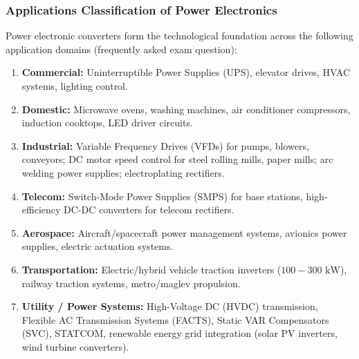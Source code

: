 \documentclass[11pt,a4paper]{article}
\begin{document}
\subsubsection{Applications Classification of Power Electronics}
Power electronic converters form the technological foundation across the following application domains (frequently asked exam question):
\begin{enumerate}[leftmargin=*]
  \item \textbf{Commercial:} Uninterruptible Power Supplies (UPS), elevator drives, HVAC systems, lighting control.
  \item \textbf{Domestic:} Microwave ovens, washing machines, air conditioner compressors, induction cooktops, LED driver circuits.
  \item \textbf{Industrial:} Variable Frequency Drives (VFDs) for pumps, blowers, conveyors; DC motor speed control for steel rolling mills, paper mills; arc welding power supplies; electroplating rectifiers.
  \item \textbf{Telecom:} Switch-Mode Power Supplies (SMPS) for base stations, high-efficiency DC-DC converters for telecom rectifiers.
  \item \textbf{Aerospace:} Aircraft/spacecraft power management systems, avionics power supplies, electric actuation systems.
  \item \textbf{Transportation:} Electric/hybrid vehicle traction inverters ($100 - 300\text{ kW}$), railway traction systems, metro/maglev propulsion.
  \item \textbf{Utility / Power Systems:} High-Voltage DC (HVDC) transmission, Flexible AC Transmission Systems (FACTS), Static VAR Compensators (SVC), STATCOM, renewable energy grid integration (solar PV inverters, wind turbine converters).
\end{enumerate}
\end{document}
